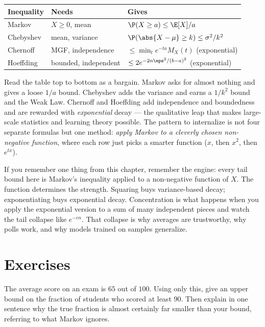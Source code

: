\begin{center}
\begin{tabular}{@{}lll@{}}
\toprule
\textbf{Inequality} & \textbf{Needs} & \textbf{Gives} \\
\midrule
Markov     & $X\ge 0$, mean & $\P(X\ge a) \le \E[X]/a$ \\
Chebyshev  & mean, variance & $\P(\abs{X-\mu}\ge k)\le \sigma^2/k^2$ \\
Chernoff   & MGF, independence & $\le \min_t e^{-ta}M_X(t)$ (exponential) \\
Hoeffding  & bounded, independent & $\le 2e^{-2n\eps^2/(b-a)^2}$ (exponential) \\
\bottomrule
\end{tabular}
\end{center}

Read the table top to bottom as a bargain. Markov asks for almost nothing and
gives a loose $1/a$ bound. Chebyshev adds the variance and earns a $1/k^2$
bound and the Weak Law. Chernoff and Hoeffding add independence and
boundedness and are rewarded with \emph{exponential} decay --- the qualitative
leap that makes large-scale statistics and learning theory possible. The
pattern to internalize is not four separate formulas but one method:
\emph{apply Markov to a cleverly chosen non-negative function}, where each row
just picks a smarter function ($x$, then $x^2$, then $e^{tx}$).

\begin{recoverybox}
If you remember one thing from this chapter, remember the engine: every tail
bound here is Markov's inequality applied to a non-negative function of $X$.
The function determines the strength. Squaring buys variance-based decay;
exponentiating buys exponential decay. Concentration is what happens when you
apply the exponential version to a sum of many independent pieces and watch the
tail collapse like $e^{-cn}$. That collapse is why averages are trustworthy,
why polls work, and why models trained on samples generalize.
\end{recoverybox}

\section{Exercises}
\label{ch19:exercises}

\begin{exercise}
\label{ch19:ex-markov}
The average score on an exam is $65$ out of $100$. Using only this, give an
upper bound on the fraction of students who scored at least $90$. Then explain
in one sentence why the true fraction is almost certainly far smaller than
your bound, referring to what Markov ignores.
\end{exercise}

